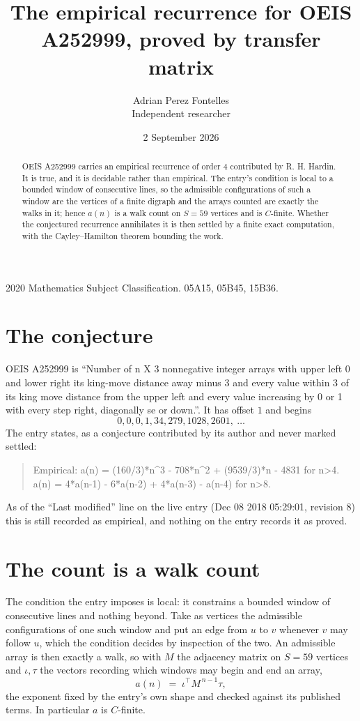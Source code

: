 \documentclass[11pt,a4paper]{article}
\title{The empirical recurrence for OEIS A252999, proved by transfer matrix}
\author{Adrian Perez Fontelles\\ \small Independent researcher}
\date{2 September 2026}
\theoremstyle{plain}
\theoremstyle{definition}
\begin{document}
\maketitle

\begin{abstract}
OEIS A252999 carries an empirical recurrence of order $4$ contributed by R. H. Hardin. It is
true, and it is decidable rather than empirical. The entry's condition is local to a bounded window of consecutive lines, so
the admissible configurations of such a window are the vertices of a finite digraph and the
arrays counted are exactly the walks in it; hence $a(n)$ is a walk count on $S=59$ vertices
and is $C$-finite. Whether the conjectured recurrence annihilates it is then settled by a
finite exact computation, with the Cayley--Hamilton theorem bounding the work.
\end{abstract}

\noindent\small 2020 Mathematics Subject Classification. 05A15, 05B45, 15B36.\normalsize

\section{The conjecture}

OEIS A252999 is ``Number of n X 3 nonnegative integer arrays with upper left 0 and lower right its king-move distance away minus 3 and every value within 3 of its king move distance from the upper left and every value increasing by 0 or 1 with every step right, diagonally se or down.''. It has offset $1$ and begins
\[
0, 0, 0, 1, 34, 279, 1028, 2601,\ \dots
\]
The entry states, as a conjecture contributed by its author and never marked settled:
\begin{quote}
Empirical: a(n) = (160/3)*n\^{}3 - 708*n\^{}2 + (9539/3)*n - 4831 for n>4. a(n) = 4*a(n-1) - 6*a(n-2) + 4*a(n-3) - a(n-4) for n>8.
\end{quote}
As of the ``Last modified'' line on the live entry (Dec 08 2018 05:29:01, revision 8) this is still
recorded as empirical, and nothing on the entry records it as proved.

\section{The count is a walk count}

The condition the entry imposes is local: it constrains a bounded window of consecutive lines and nothing beyond. Take as
vertices the admissible configurations of one such window and put an edge from $u$ to $v$
whenever $v$ may follow $u$, which the condition decides by inspection of the two. An
admissible array is then exactly a walk, so with $M$ the adjacency matrix on $S=59$ vertices
and $\iota,\tau$ the vectors recording which windows may begin and end an array,
\[
a(n)\;=\;\iota^{\!\top}M^{\,n-1}\tau ,
\]
the exponent fixed by the entry's own shape and checked against its published terms. In
particular $a$ is $C$-finite.
\end{document}

